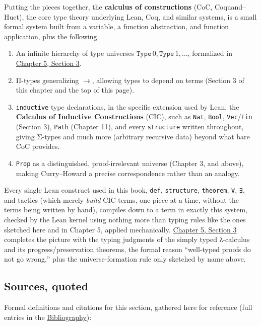 Putting the pieces together, the \textbf{calculus of constructions} (CoC, Coquand--Huet), the core type theory underlying Lean, Coq, and similar systems, is a small formal system built from a variable, a function abstraction, and function application, plus the following.

\begin{enumerate}
\def\labelenumi{\arabic{enumi}.}
\tightlist
\item
  An infinite hierarchy of type universes \(\mathtt{Type}\,0, \mathtt{Type}\,1, \ldots\), formalized in \hyperref[sec:05-rigor-check:03-typing-rules-and-safety:1]{Chapter 5, Section 3}.
\item
  Π-types generalizing \(\to\), allowing types to depend on terms (Section 3 of this chapter and the top of this page).
\item
  \texttt{inductive} type declarations, in the specific extension used by Lean, the \textbf{Calculus of Inductive Constructions} (CIC), such as \texttt{Nat}, \texttt{Bool}, \texttt{Vec}/\texttt{Fin} (Section 3), \texttt{Path} (Chapter 11), and every \texttt{structure} written throughout, giving Σ-types and much more (arbitrary recursive data) beyond what bare CoC provides.
\item
  \texttt{Prop} as a distinguished, proof-irrelevant universe (Chapter 3, and above), making Curry--Howard a precise correspondence rather than an analogy.
\end{enumerate}

Every single Lean construct used in this book, \texttt{def}, \texttt{structure}, \texttt{theorem}, \texttt{∀}, \texttt{∃}, and tactics (which merely \emph{build} CIC terms, one piece at a time, without the terms being written by hand), compiles down to a term in exactly this system, checked by the Lean kernel using nothing more than typing rules like the ones sketched here and in Chapter 5, applied mechanically. \hyperref[sec:05-rigor-check:03-typing-rules-and-safety:1]{Chapter 5, Section 3} completes the picture with the typing judgments of the simply typed λ-calculus and its progress/preservation theorems, the formal reason ``well-typed proofs do not go wrong,'' plus the universe-formation rule only sketched by name above.

\subsection{Sources, quoted}\label{sec:01-basics:05-pi-sigma-and-coc:8}

Formal definitions and citations for this section, gathered here for reference (full entries in the \hyperref[sec:root:bibliography:1]{Bibliography}):

